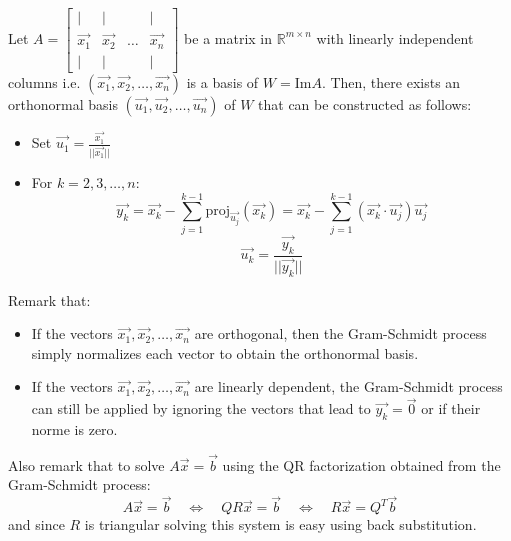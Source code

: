 \begin{theorem}
    Let $A = \begin{bmatrix}
        | & | & & | \\
        \vec{x_1} & \vec{x_2} & \ldots & \vec{x_n} \\
        | & | & & |
    \end{bmatrix}$ be a matrix in $\mathbb{R}^{m \times n}$ with linearly independent columns i.e. $(\vec{x_1}, \vec{x_2}, \ldots, \vec{x_n})$ is a basis of $W = \text{Im} A$. Then, there exists an orthonormal basis $(\vec{u_1}, \vec{u_2}, \ldots, \vec{u_n})$ of $W$ that can be constructed as follows:
    \begin{itemize}[itemsep=1pt,label=$\circ$]
        \item Set $\vec{u_1} = \frac{\vec{x_1}}{||\vec{x_1}||}$
        \item For $k = 2, 3, \ldots, n$:
        \[
            \vec{y_k} = \vec{x_k} - \sum_{j=1}^{k-1} \text{proj}_{\vec{u_j}}(\vec{x_k}) = \vec{x_k} - \sum_{j=1}^{k-1} (\vec{x_k} \cdot \vec{u_j}) \vec{u_j}
        \]
        \[
            \vec{u_k} = \frac{\vec{y_k}}{||\vec{y_k}||}
        \]
    \end{itemize}
\end{theorem}
Remark that:
\begin{itemize}[itemsep=1pt,label=$\circ$]
    \item If the vectors $\vec{x_1}, \vec{x_2}, \ldots, \vec{x_n}$ are orthogonal, then the Gram-Schmidt process simply normalizes each vector to obtain the orthonormal basis.
    \item If the vectors $\vec{x_1}, \vec{x_2}, \ldots, \vec{x_n}$ are linearly dependent, the Gram-Schmidt process can still be applied by ignoring the vectors that lead to $\vec{y_k} = \vec{0}$ or if their norme is zero.
\end{itemize}
Also remark that to solve $A \vec{x} = \vec{b}$ using the QR factorization obtained from the Gram-Schmidt process:
\[
    A \vec{x} = \vec{b} \quad \iff \quad Q R \vec{x} = \vec{b} \quad \iff \quad R \vec{x} = Q^T \vec{b}
\]
and since $R$ is triangular solving this system is easy using back substitution.

